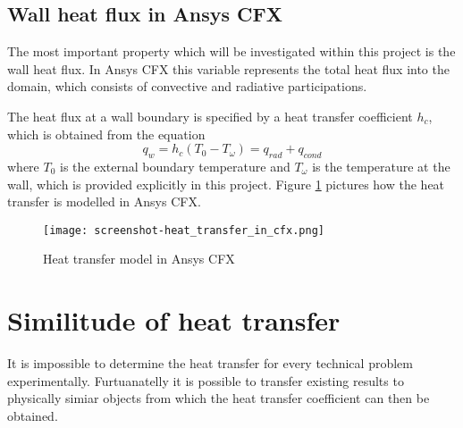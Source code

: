 \subsection{Wall heat flux in Ansys CFX}
The most important property which will be investigated within this project is the wall heat flux. In Ansys CFX this variable represents the total heat flux into the domain, which consists of convective and radiative participations.

The heat flux at a wall boundary is specified by a heat transfer coefficient $h_c$, which is obtained from the equation
\begin{equation}
q_w = h_c (T_0 - T_{\omega} ) = q_{rad} + q_{cond}
\end{equation}
where $T_0$ is the external boundary temperature and $T_{\omega}$ is the temperature at the wall, which is provided explicitly in this project. Figure \ref{fig:ht_in_cfx} pictures how the heat transfer is modelled in Ansys CFX.
\begin{figure}[h]
\centering
\texttt{[image: screenshot-heat\_transfer\_in\_cfx.png]}
\caption{Heat transfer model in Ansys CFX}
\label{fig:ht_in_cfx}
\end{figure}
\section{Similitude of heat transfer}
It is impossible to determine the heat transfer for every technical problem experimentally. Furtuanatelly it is possible to transfer existing results to physically simiar objects from which the heat transfer coefficient can then be obtained.

